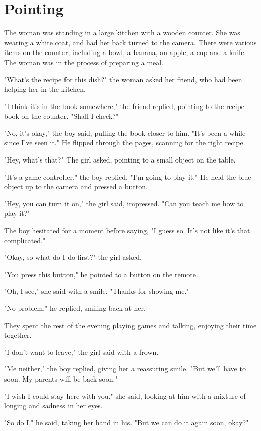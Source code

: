 \documentclass[smalldemyvopaper,11pt,twoside,onecolumn,openright,extrafontsizes]{memoir}
\begin{document}
\chapter{Pointing}
The woman was standing in a large kitchen with a wooden counter. She was wearing a white coat, and had her back turned to the camera. There were various items on the counter, including a bowl, a banana, an apple, a cup and a knife. The woman was in the process of preparing a meal.\par
"What's the recipe for this dish?" the woman asked her friend, who had been helping her in the kitchen.\par
"I think it's in the book somewhere," the friend replied, pointing to the recipe book on the counter. "Shall I check?"\par
"No, it's okay," the boy said, pulling the book closer to him. "It's been a while since I've seen it." He flipped through the pages, scanning for the right recipe.\par
"Hey, what's that?" The girl asked, pointing to a small object on the table.\par
"It's a game controller," the boy replied. "I'm going to play it." He held the blue object up to the camera and pressed a button.\par
"Hey, you can turn it on," the girl said, impressed. "Can you teach me how to play it?"\par
The boy hesitated for a moment before saying, "I guess so. It's not like it's that complicated."\par
"Okay, so what do I do first?" the girl asked.\par
"You press this button," he pointed to a button on the remote.\par
"Oh, I see," she said with a smile. "Thanks for showing me."\par
"No problem," he replied, smiling back at her.\par
They spent the rest of the evening playing games and talking, enjoying their time together.\par
"I don't want to leave," the girl said with a frown.\par
"Me neither," the boy replied, giving her a reassuring smile. "But we'll have to soon. My parents will be back soon."\par
"I wish I could stay here with you," she said, looking at him with a mixture of longing and sadness in her eyes.\par
"So do I," he said, taking her hand in his. "But we can do it again soon, okay?"\par
\end{document}
